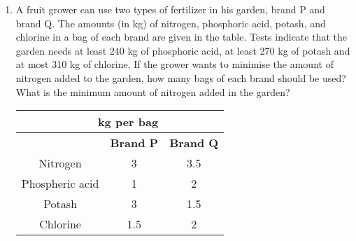 \begin{enumerate}[label=\arabic*.,ref=\thesubsection.\theenumi]
\begin{tabular}{|c|c|c|}
\end{tabular}\\

Assuming that the transportation cost of 10 litres of oil is Re 1 per km, how
should the delivery be scheduled in order that the transportation cost is minimum?
What is the minimum cost?\\
\item A fruit grower can use two types of fertilizer in his garden, brand P and brand Q.
The amounts (in kg) of nitrogen, phosphoric acid, potash, and chlorine in a bag of
each brand are given in the table. Tests indicate that the garden needs at least
240 kg of phosphoric acid, at least 270 kg of potash and at most 310 kg of
chlorine.
If the grower wants to minimise the amount of nitrogen added to the garden,
how many bags of each brand should be used? What is the minimum amount of
nitrogen added in the garden?\\
\begin{tabular}{|c|c|c|}
\hline
 \multicolumn{2}{|r}{\textbf{ kg per bag}}& \\ \cline{1-3}
\hline
&\textbf{Brand P}&\textbf{Brand Q}\\
\hline
Nitrogen&3&3.5\\
\hline
Phospheric acid&1&2\\
\hline
Potash&3&1.5\\
\hline
Chlorine&1.5&2\\
\hline

\end{tabular}


\end{enumerate}

